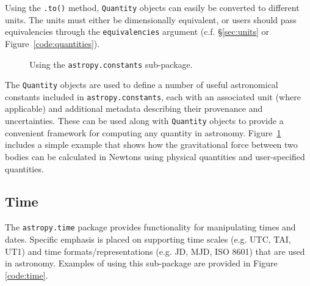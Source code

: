 \documentclass[traditabstract]{aa}
\begin{document}
Using the \texttt{.to()} method, \texttt{Quantity} objects can easily be
converted to different units. The units must either be dimensionally
equivalent, or users should pass equivalencies through the
\texttt{equivalencies} argument (c.f. \S\ref{sec:units} or Figure~\ref{code:quantities}).

\begin{figure}
\center
\caption{Using the \texttt{astropy.constants} sub-package.\label{code:constants}}
\vspace{0.1in}
\end{figure}

The \texttt{Quantity} objects are used to define a number of useful
astronomical constants included in \texttt{astropy.constants}, each with an associated unit
(where applicable) and additional metadata describing their provenance and
uncertainties. These can be used along with \texttt{Quantity} objects to
provide a convenient framework for computing any quantity in astronomy.
Figure~\ref{code:constants} includes a simple example that shows how the
gravitational force between two bodies can be calculated in Newtons using
physical quantities and user-specified quantities.

\subsection{Time}

\label{sec:time}


The \texttt{astropy.time} package provides functionality for manipulating times
and dates. Specific emphasis is placed on supporting time scales (e.g. UTC,
TAI, UT1) and time formats/representations (e.g. JD, MJD, ISO 8601) that are
used in astronomy. Examples of using this sub-package are provided in Figure
\ref{code:time}.
\end{document}
